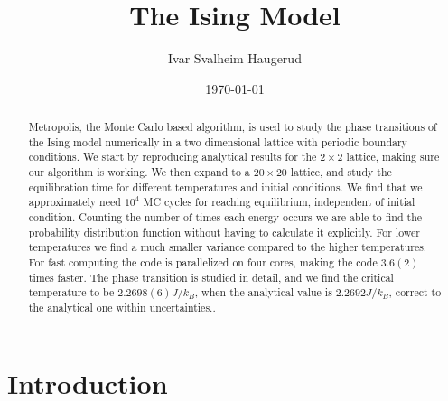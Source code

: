 \documentclass[%
 reprint,
nofootinbib,
aps,
]{revtex4-1}
\begin{document}

\title{The Ising Model}%


\author{Ivar Svalheim Haugerud}

%


\date{\today}%

\begin{abstract}
Metropolis, the Monte Carlo based algorithm, is used to study the phase transitions of the Ising model numerically in a two dimensional lattice with periodic boundary conditions. We start by reproducing analytical results for the $2\times 2$ lattice, making sure our algorithm is working. We then expand to a $20\times 20$ lattice, and study the equilibration time for different temperatures and initial conditions. We find that we approximately need $10^4$ MC cycles for reaching equilibrium, independent of initial condition. Counting the number of times each energy occurs we are able to find the probability distribution function without having to calculate it explicitly. For lower temperatures we find a much smaller variance compared to the higher temperatures. For fast computing the code is parallelized on four cores, making the code $3.6(2)$ times faster. The phase transition is studied in detail, and we find the critical temperature to be $2.2698(6)J/k_B$, when the analytical value is $ 2.2692J/k_B$, correct to the analytical one within uncertainties..
\end{abstract}
\maketitle


\section{Introduction}
\end{document}
